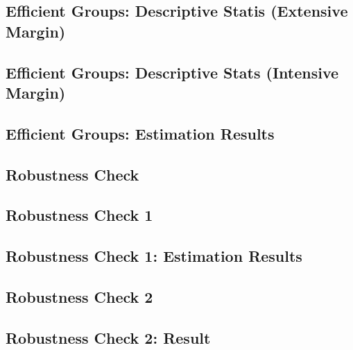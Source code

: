 \documentclass[ review  , 3p ]{elsarticle}
\begin{document}
  \hypertarget{efficient-groups-descriptive-statis-extensive-margin}{%
  \subsection{Efficient Groups: Descriptive Statis (Extensive Margin)}\label{efficient-groups-descriptive-statis-extensive-margin}}
  
  \hypertarget{efficient-groups-descriptive-stats-intensive-margin}{%
  \subsection{Efficient Groups: Descriptive Stats (Intensive Margin)}\label{efficient-groups-descriptive-stats-intensive-margin}}
  
  \hypertarget{efficient-groups-estimation-results}{%
  \subsection{Efficient Groups: Estimation Results}\label{efficient-groups-estimation-results}}
  
  \hypertarget{robustness-check-2}{%
  \subsection{Robustness Check}\label{robustness-check-2}}
  
  \hypertarget{robustness-check-1-1}{%
  \subsection{Robustness Check 1}\label{robustness-check-1-1}}
  
  \hypertarget{robustness-check-1-estimation-results}{%
  \subsection{Robustness Check 1: Estimation Results}\label{robustness-check-1-estimation-results}}
  
  \hypertarget{robustness-check-2-1}{%
  \subsection{Robustness Check 2}\label{robustness-check-2-1}}
  
  \hypertarget{robustness-check-2-result-1}{%
  \subsection{Robustness Check 2: Result}\label{robustness-check-2-result-1}}
  
\end{document}
